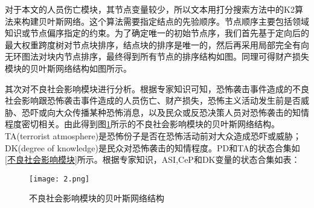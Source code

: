 \documentclass[bwprint]{gmcmthesis}
\begin{document}
对于本文的人员伤亡模块，其节点变量较少，所以文本用打分搜索方法中的K2算法来构建贝叶斯网络。这个算法需要指定结点的先验顺序。节点顺序主要包括领域知识或节点偏序指定的约束。为了确定唯一的初始节点序，我们首先基于定向后的最大权重跨度树对节点块排序，结点块的排序是唯一的，然后再采用局部完全有向无环图法对块内节点排序，最终得到所有节点的排序结构如图。同理可得财产损失模块的贝叶斯网络结构如图所示。

其次对不良社会影响模块进行分析。根据专家知识可知，恐怖袭击事件造成的不良社会影响跟恐怖袭击事件造成的人员伤亡、财产损失，恐怖主义活动发生前是否威胁、恐吓或向大众传播某种恐怖消息，以及民众或反恐决策人员对恐怖袭击的知情程度密切相关。由此得到图\ref{不良社会影响模块的贝叶斯网络结构}所示的不良社会影响模块的贝叶斯网络结构。TA(terrorist atmosphere)是恐怖份子是否在恐怖活动前对大众造成恐吓或威胁；DK(degree of knowledge)是民众对恐怖袭击的知情程度。PD和TA的状态合集如\ref{不良社会影响模块}所示。根据专家知识，ASI,CeP和DK变量的状态合集如表：

\begin{figure}[!h]
	\centering
	\texttt{[image: 2.png]}
	\caption{不良社会影响模块的贝叶斯网络结构}
	\label{不良社会影响模块的贝叶斯网络结构}
\end{figure}
\end{document}
